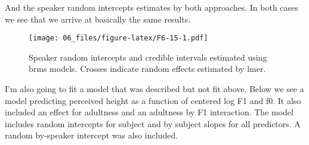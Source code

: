 \documentclass[
]{book}
\newenvironment{Shaded}{\begin{snugshade}}{\end{snugshade}}
\newcommand{\AttributeTok}[1]{\textcolor[rgb]{0.77,0.63,0.00}{#1}}
\newcommand{\CommentTok}[1]{\textcolor[rgb]{0.56,0.35,0.01}{\textit{#1}}}
\newcommand{\DecValTok}[1]{\textcolor[rgb]{0.00,0.00,0.81}{#1}}
\newcommand{\FunctionTok}[1]{\textcolor[rgb]{0.00,0.00,0.00}{#1}}
\newcommand{\NormalTok}[1]{#1}
\newcommand{\OtherTok}[1]{\textcolor[rgb]{0.56,0.35,0.01}{#1}}
\newcommand{\SpecialCharTok}[1]{\textcolor[rgb]{0.00,0.00,0.00}{#1}}
\newcommand{\StringTok}[1]{\textcolor[rgb]{0.31,0.60,0.02}{#1}}
\begin{document}
And the speaker random intercepts estimates by both approaches. In both cases we see that we arrive at basically the same results.

\begin{figure}
\centering
\texttt{[image: 06\_files/figure-latex/F6-15-1.pdf]}
\caption{\label{fig:F6-15}Speaker random intercepts and credible intervals estimated using brms models. Crosses indicate random effects estimated by lmer.}
\end{figure}

I'm also going to fit a model that was described but not fit above. Below we see a model predicting perceived height as a function of centered log F1 and f0. It also included an effect for adultness and an adultness by F1 interaction. The model includes random intercepts for subject and by subject slopes for all predictors. A random by-speaker intercept was also included.

\begin{Shaded}
\end{Shaded}
\end{document}
